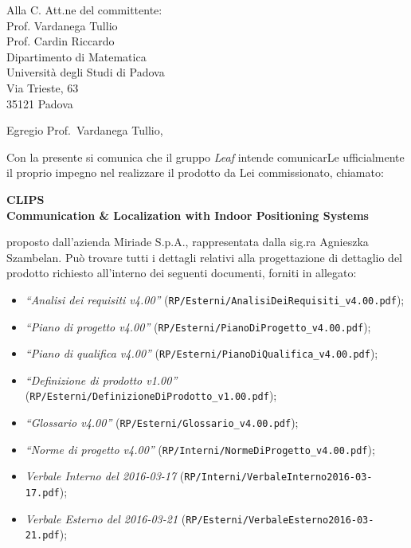 \documentclass[a4paper,12pt]{letteracdp}
\author{Oscar Elia Conti}
\date{11 aprile 2016}
\begin{document}
	\begin{letter}{
		Alla C. Att.ne del committente: \\
		Prof. Vardanega Tullio \\
		Prof. Cardin Riccardo \\
		Dipartimento di Matematica \\
		Università degli Studi di Padova \\
		Via Trieste, 63 \\
		35121 Padova}
		
		\opening{Egregio Prof.~Vardanega Tullio,}
		Con la presente si comunica che il gruppo \textit{Leaf} intende comunicarLe ufficialmente il proprio impegno nel realizzare il prodotto da Lei commissionato, chiamato:
\begin{center}
	\textbf{CLIPS \\ Communication \& Localization with Indoor Positioning Systems}
\end{center}
proposto dall'azienda Miriade S.p.A., rappresentata dalla sig.ra Agnieszka Szambelan.
Può trovare tutti i dettagli relativi alla progettazione di dettaglio del prodotto richiesto all'interno dei seguenti documenti, forniti in allegato:

\begin{itemize}
	\item \textit{“Analisi dei requisiti v4.00”} (\texttt{RP/Esterni/AnalisiDeiRequisiti\_v4.00.pdf});

	\item \textit{“Piano di progetto v4.00”} (\texttt{RP/Esterni/PianoDiProgetto\_v4.00.pdf});

	\item \textit{“Piano di qualifica v4.00”} (\texttt{RP/Esterni/PianoDiQualifica\_v4.00.pdf});
	
	\item \textit{“Definizione di prodotto v1.00”} (\texttt{RP/Esterni/DefinizioneDiProdotto\_v1.00.pdf});
	
	\item \textit{“Glossario v4.00”} (\texttt{RP/Esterni/Glossario\_v4.00.pdf});
	
	\item \textit{“Norme di progetto v4.00”} (\texttt{RP/Interni/NormeDiProgetto\_v4.00.pdf});

	\item \textit{Verbale Interno del 2016-03-17}	(\texttt{RP/Interni/VerbaleInterno2016-03-17.pdf});
	
	\item \textit{Verbale Esterno del 2016-03-21}	(\texttt{RP/Esterni/VerbaleEsterno2016-03-21.pdf});
		

\end{itemize}
\end{letter}
\end{document}
